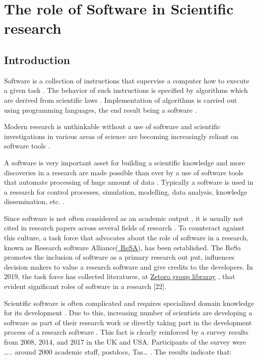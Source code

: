 \section{The role of Software in Scientific research}
\subsection{Introduction}
Software is a collection of instructions that supervise a computer how to execute a given task \cite{enwiki:1056292826}. The behavior of such instructions is specified by algorithms which are derived from scientific laws \cite{wolfram1984computer}.  Implementation of algorithms is carried out using programming languages, the end result being a software \cite{enwiki:1055624679} \cite{enwiki:1055665216}. 

Modern research is unthinkable without a use of software and scientific investigations in various areas of science are becoming increasingly reliant on software tools \cite{goble2014better} \cite{wilson2014best} \cite{storer2017bridging}. 

A software is very important asset for building a scientific knowledge and more discoveries in a research are made possible than ever by a use of software tools that automate processing of huge amount of data \cite{jimenez2017four}. Typically a software is used in a research for control processes, simulation, modelling, data analysis, knowledge dissemination, etc. \cite{hannay2009scientists}\cite{pan2016disciplinary}.

Since software is not often considered as an academic output \cite{yang2018important}\cite{pan2016disciplinary}, it is usually not cited in research papers across several fields of research \cite{pan2016disciplinary}. To counteract against this culture, a task force that advocates about the role of software in a research, known as Research software Alliance(\href{https://www.researchsoft.org/}{ ReSA}), has been established. The ReSa promotes the inclusion of software as a primary research out put, influences decision makers to value a research software and give credits to the developers. In 2019, the task force has collected literatures, at \href{https://www.zotero.org/groups/2400609/resa/library}{Zetoro group libraray} , that evident significant roles of software in a research [22].  

Scientific software is often complicated and requires specialized domain knowledge for its development \cite{wilson2014best}. Due to this, increasing number of scientists are developing a software as part of their research work or directly taking part in the development process of a research software \cite{jimenez2017four}\cite{kanewala2014testing}. This fact is clearly reinforced by a  survey results  from 2008, 2014, and 2017  in the UK and USA. Participants of the survey were ….. around 2000 academic staff, postdocs, Tas… \cite{merali2010computational}\cite{hettrick2014uk}\cite{nangia2017track}.  The results indicate that:

